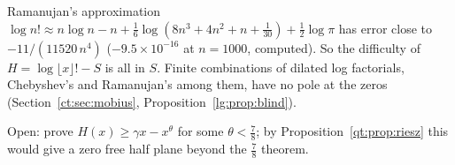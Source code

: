 \begin{remark}\label{sw:rem:ram}
Ramanujan's approximation $\log n!\approx n\log n-n+\tfrac16\log(8n^3+4n^2+n+\tfrac1{30})+\tfrac12\log\pi$ has error close to $-11/(11520\,n^4)$ ($-9.5\times10^{-16}$ at $n=1000$, computed). So the difficulty of $H=\log\lfloor x\rfloor!-S$ is all in $S$. Finite combinations of dilated log factorials, Chebyshev's and Ramanujan's among them, have no pole at the zeros (Section~\ref{ct:sec:mobius}, Proposition~\ref{lg:prop:blind}).
\end{remark}

Open: prove $H(x)\ge\gamma x-x^\theta$ for some $\theta<\frac78$; by Proposition~\ref{qt:prop:riesz} this would give a zero free half plane beyond the $\frac78$ theorem.